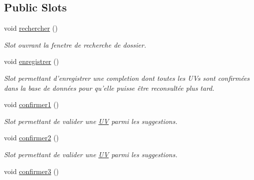 \subsection*{Public Slots}
\begin{DoxyCompactItemize}
\item 
\hypertarget{class_completion_profil_window_ac0be1871923bef6992015e5a63d47c3b}{void \hyperlink{class_completion_profil_window_ac0be1871923bef6992015e5a63d47c3b}{rechercher} ()}\label{class_completion_profil_window_ac0be1871923bef6992015e5a63d47c3b}

\begin{DoxyCompactList}\small\item\em Slot ouvrant la fenetre de recherche de dossier. \end{DoxyCompactList}\item 
\hypertarget{class_completion_profil_window_a76e6fa43ca5d053ca5c61a2b5f85d550}{void \hyperlink{class_completion_profil_window_a76e6fa43ca5d053ca5c61a2b5f85d550}{enregistrer} ()}\label{class_completion_profil_window_a76e6fa43ca5d053ca5c61a2b5f85d550}

\begin{DoxyCompactList}\small\item\em Slot permettant d'enregistrer une completion dont toutes les U\-Vs sont confirmées dans la base de données pour qu'elle puisse être reconsultée plus tard. \end{DoxyCompactList}\item 
\hypertarget{class_completion_profil_window_a2d9eafb639de00df21045450fc622ec6}{void \hyperlink{class_completion_profil_window_a2d9eafb639de00df21045450fc622ec6}{confirmer1} ()}\label{class_completion_profil_window_a2d9eafb639de00df21045450fc622ec6}

\begin{DoxyCompactList}\small\item\em Slot permettant de valider une \hyperlink{class_u_v}{U\-V} parmi les suggestions. \end{DoxyCompactList}\item 
\hypertarget{class_completion_profil_window_a279a78595903d7d6be1ff0b175345391}{void \hyperlink{class_completion_profil_window_a279a78595903d7d6be1ff0b175345391}{confirmer2} ()}\label{class_completion_profil_window_a279a78595903d7d6be1ff0b175345391}

\begin{DoxyCompactList}\small\item\em Slot permettant de valider une \hyperlink{class_u_v}{U\-V} parmi les suggestions. \end{DoxyCompactList}\item 
\hypertarget{class_completion_profil_window_a073eb07059b6e57b4318759daf61db44}{void \hyperlink{class_completion_profil_window_a073eb07059b6e57b4318759daf61db44}{confirmer3} ()}\label{class_completion_profil_window_a073eb07059b6e57b4318759daf61db44}


\end{DoxyCompactItemize}
